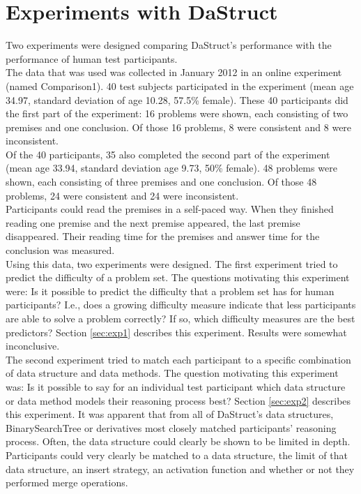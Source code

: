 \documentclass[hidelinks]{scrartcl}
\begin{document}
\section{Experiments with DaStruct}
Two experiments were designed comparing DaStruct's performance with the performance of human test participants. \\

The data that was used was collected in January 2012 in an online experiment (named Comparison1). 40 test subjects participated in the experiment (mean  age 34.97, standard deviation of age 10.28, 57.5\% female).
These 40 participants did the first part of the experiment: 16 problems were shown, each consisting of two premises and one conclusion. Of those 16 problems, 8 were consistent and 8 were inconsistent. \\
Of the 40 participants, 35 also completed the second part of the experiment (mean age 33.94, standard deviation age 9.73, 50\% female). 48 problems were shown, each consisting of three premises and one conclusion. Of those 48 problems, 24 were consistent and 24 were inconsistent. \\
Participants could read the premises in a self-paced way. When they finished reading one premise and the next premise appeared, the last premise disappeared. Their reading time for the premises and answer time for the conclusion was measured. \\

Using this data, two experiments were designed. The first experiment tried to predict the difficulty of a problem set. The questions motivating this experiment were: Is it possible to predict the difficulty that a problem set has for human participants? I.e., does a growing difficulty measure indicate that less participants are able to solve a problem correctly? If so, which difficulty measures are the best predictors? Section \ref{sec:exp1} describes this experiment. Results were somewhat inconclusive. \\
The second experiment tried to match each participant to a specific combination of data structure and data methods. The question motivating this experiment was: Is it possible to say for an individual test participant which data structure or data method models their reasoning process best? Section \ref{sec:exp2} describes this experiment. It was apparent that from all of DaStruct's data structures, BinarySearchTree or derivatives most closely matched participants' reasoning process. Often, the data structure could clearly be shown to be limited in depth. Participants could very clearly be matched to a data structure, the limit of that data structure, an insert strategy, an activation function and whether or not they performed merge operations.
\end{document}
